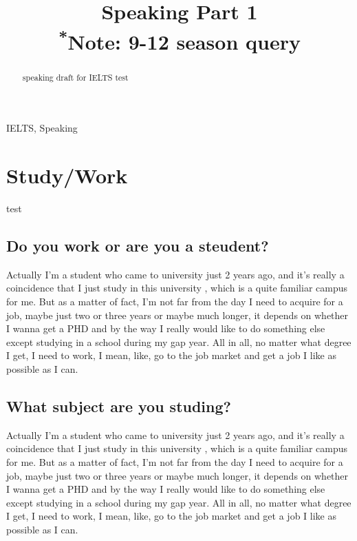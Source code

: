 \documentclass[conference]{IEEEtran}
\begin{document}
\title{Speaking Part 1\\
{\footnotesize \textsuperscript{*}Note:
9-12 season query}
}

\author{
}

\maketitle

\begin{abstract}
speaking draft for IELTS test
\end{abstract}

\begin{IEEEkeywords}
IELTS, Speaking
\end{IEEEkeywords}


\section{Study/Work}
test
\subsection{Do you work or are you a steudent?}
Actually I’m a student who came to university just 2 years ago, 
and it’s really a coincidence that I just study in this university
, which is a quite familiar campus for me.
But as a matter of fact, I’m not far from the day I need to acquire for a job, 
maybe just two or three years or maybe much longer, 
it depends on whether I wanna get a PHD and by the way I really 
would like to do something else except studying in a school during my gap year. 
All in all, no matter what degree I get, I need to work, 
I mean, like, go to the job market and get a job I like as possible as I can.

\subsection{What subject are you studing?}
Actually I’m a student who came to university just 2 years ago, 
and it’s really a coincidence that I just study in this university
, which is a quite familiar campus for me.
But as a matter of fact, I’m not far from the day I need to acquire for a job, 
maybe just two or three years or maybe much longer, 
it depends on whether I wanna get a PHD and by the way I really 
would like to do something else except studying in a school during my gap year. 
All in all, no matter what degree I get, I need to work, 
I mean, like, go to the job market and get a job I like as possible as I can.
\end{document}
